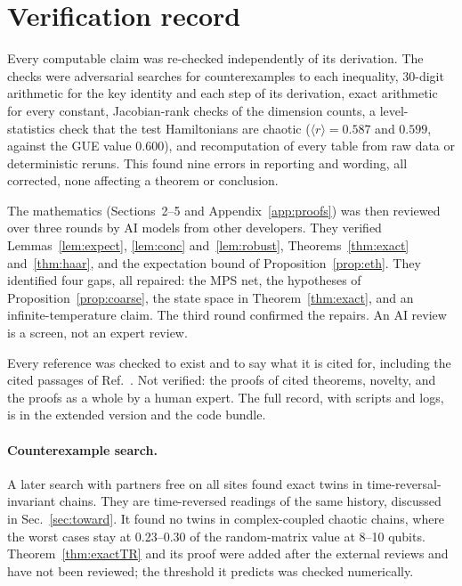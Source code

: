 \documentclass[11pt]{article}
\theoremstyle{definition}
\theoremstyle{remark}
\begin{document}
\section{Verification record}
\label{app:verify}

Every computable claim was re-checked independently of its derivation. The checks were adversarial searches for counterexamples to each inequality, 30-digit arithmetic for the key identity and each step of its derivation, exact arithmetic for every constant, Jacobian-rank checks of the dimension counts, a level-statistics check that the test Hamiltonians are chaotic ($\langle r\rangle=0.587$ and $0.599$, against the GUE value 0.600), and recomputation of every table from raw data or deterministic reruns. This found nine errors in reporting and wording, all corrected, none affecting a theorem or conclusion.

The mathematics (Sections~2--5 and Appendix~\ref{app:proofs}) was then reviewed over three rounds by AI models from other developers. They verified Lemmas~\ref{lem:expect}, \ref{lem:conc} and~\ref{lem:robust}, Theorems~\ref{thm:exact} and~\ref{thm:haar}, and the expectation bound of Proposition~\ref{prop:eth}. They identified four gaps, all repaired: the MPS net, the hypotheses of Proposition~\ref{prop:coarse}, the state space in Theorem~\ref{thm:exact}, and an infinite-temperature claim. The third round confirmed the repairs. An AI review is a screen, not an expert review.

Every reference was checked to exist and to say what it is cited for, including the cited passages of Ref.~\cite{Stoica2022}. Not verified: the proofs of cited theorems, novelty, and the proofs as a whole by a human expert. The full record, with scripts and logs, is in the extended version and the code bundle.

\paragraph{Counterexample search.} A later search with partners free on all sites found exact twins in time-reversal-invariant chains. They are time-reversed readings of the same history, discussed in Sec.~\ref{sec:toward}. It found no twins in complex-coupled chaotic chains, where the worst cases stay at 0.23--0.30 of the random-matrix value at 8--10 qubits. Theorem~\ref{thm:exactTR} and its proof were added after the external reviews and have not been reviewed; the threshold it predicts was checked numerically.
\end{document}
